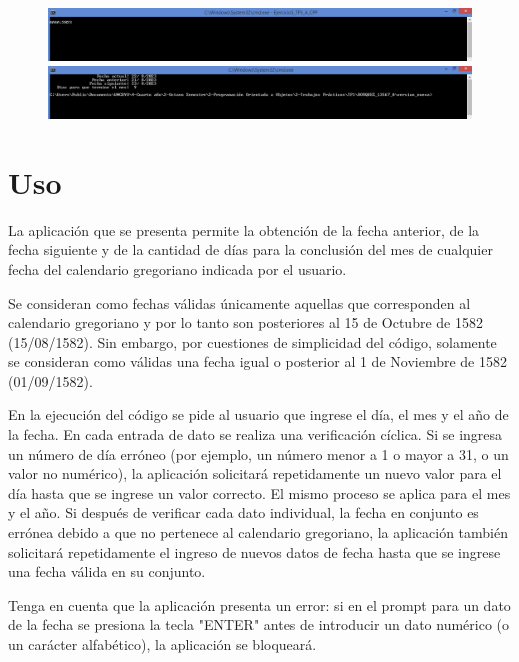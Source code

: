 \documentclass[a4paper,12pt]{article}
\begin{document}
\begin{figure}[!ht]
\begin{adjustbox}{max width=\textwidth, center}
    \end{adjustbox}
    \begin{adjustbox}{max width=\textwidth, center}
        \includegraphics{Captura_UI_7.PNG}
    \end{adjustbox}
    \begin{adjustbox}{max width=\textwidth, center}
        \includegraphics{Captura_UI_8.PNG}
    \end{adjustbox}
\end{figure}
\newpage
\section{Uso}

La aplicación que se presenta permite la obtención de la fecha anterior, de la fecha siguiente y de la cantidad de días para la conclusión del mes de cualquier fecha del calendario gregoriano indicada por el usuario.

Se consideran como fechas válidas únicamente aquellas que corresponden al calendario gregoriano y por lo tanto son posteriores al 15 de Octubre de 1582 (15/08/1582). Sin embargo, por cuestiones de simplicidad del código, solamente se consideran como válidas una fecha igual o posterior al 1 de Noviembre de 1582 (01/09/1582).

En la ejecución del código se pide al usuario que ingrese el día, el mes y el año de la fecha. En cada entrada de dato se realiza una verificación cíclica. Si se ingresa un número de día erróneo (por ejemplo, un número menor a 1 o mayor a 31, o un valor no numérico), la aplicación solicitará repetidamente un nuevo valor para el día hasta que se ingrese un valor correcto. El mismo proceso se aplica para el mes y el año. Si después de verificar cada dato individual, la fecha en conjunto es errónea debido a que no pertenece al calendario gregoriano, la aplicación también solicitará repetidamente el ingreso de nuevos datos de fecha hasta que se ingrese una fecha válida en su conjunto.

Tenga en cuenta que la aplicación presenta un error: si en el prompt para un dato de la fecha se presiona la tecla "ENTER" antes de introducir un dato numérico (o un carácter alfabético), la aplicación se bloqueará.
\end{document}
